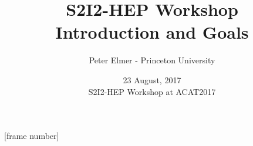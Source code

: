 \documentclass{beamer}
\title{S2I2-HEP Workshop \\ 
       Introduction and Goals}
\author{Peter Elmer - Princeton University}
\date{23 August, 2017 \\ S2I2-HEP Workshop at ACAT2017}
\begin{document}
\maketitle

%
%

[frame number]


%
%
%















\end{document}
